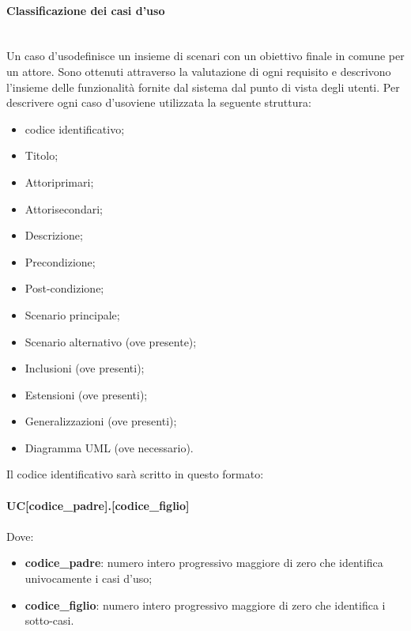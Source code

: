 		\paragraph*{Classificazione dei casi d'uso}\mbox{}\\ [1mm]
		Un caso d'uso\glosp definisce un insieme di scenari con un obiettivo finale in comune per un attore\glo. Sono ottenuti attraverso la valutazione di ogni requisito e descrivono l'insieme delle funzionalità fornite dal sistema dal punto di vista degli utenti.
		Per descrivere ogni caso d'uso\glosp viene utilizzata la seguente struttura:
		\begin{itemize}
			\item codice identificativo;
			\item Titolo;
			\item Attori\glosp primari;
			\item Attori\glosp secondari;
			\item Descrizione;
			\item Precondizione;
			\item Post-condizione;
			\item Scenario principale;
			\item Scenario alternativo (ove presente);
			\item Inclusioni (ove presenti);
			\item Estensioni (ove presenti);
			\item Generalizzazioni (ove presenti);
			\item Diagramma UML (ove necessario).	
		\end{itemize}
		Il codice identificativo sarà scritto in questo formato: \\
		\\ \textbf{UC[codice\_padre].[codice\_figlio]} \\
		\\ Dove:
		\begin{itemize}
			\item \textbf{codice\_padre}: numero intero progressivo maggiore di zero che identifica univocamente i casi d'uso\glo;
			\item \textbf{codice\_figlio}: numero intero progressivo maggiore di zero che identifica i sotto-casi.
		\end{itemize}
